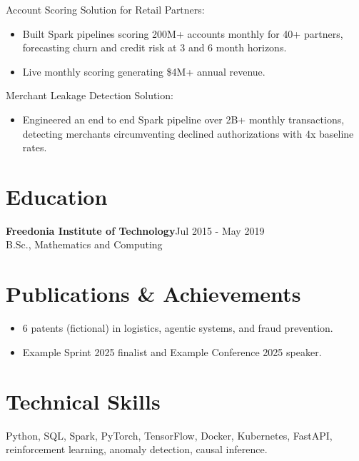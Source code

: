 \documentclass[10pt]{article}
\newcommand{\entry}[2]{{\bfseries #1}\hfill {#2}\\[-0.3em]}
\newcommand{\proj}[1]{\vspace{1pt}#1:\\[-0.4em]}
\begin{document}
\proj{Account Scoring Solution for Retail Partners}
\begin{itemize}
\item Built Spark pipelines scoring 200M+ accounts monthly for 40+ partners, forecasting churn and credit risk at 3 and 6 month horizons.
\item Live monthly scoring generating \$4M+ annual revenue.
\end{itemize}

\proj{Merchant Leakage Detection Solution}
\begin{itemize}
\item Engineered an end to end Spark pipeline over 2B+ monthly transactions, detecting merchants circumventing declined authorizations with 4x baseline rates.
\end{itemize}

\section{Education}
\entry{Freedonia Institute of Technology}{Jul 2015 - May 2019}
B.Sc., Mathematics and Computing

\section{Publications \& Achievements}
\begin{itemize}
\item 6 patents (fictional) in logistics, agentic systems, and fraud prevention.
\item Example Sprint 2025 finalist and Example Conference 2025 speaker.
\end{itemize}

\section{Technical Skills}
Python, SQL, Spark, PyTorch, TensorFlow, Docker, Kubernetes, FastAPI, reinforcement learning, anomaly detection, causal inference.
\end{document}
